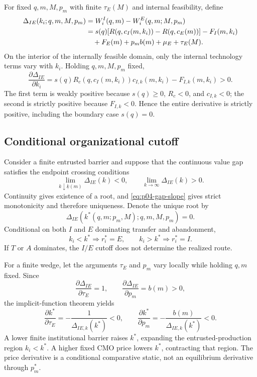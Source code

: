 For fixed \(q,m,M,p_m\) with finite \(\tau_E(M)\) and internal
feasibility, define
\begin{align}
  \Delta_{IE}(k_i;q,m,M,p_m)
  &=
  W_i^I(q,m)-W_i^E(q,m;M,p_m) \notag\\
  &=
  s(q)\!\left[
    R\!\left(q,c_I(m,k_i)\right)
    -R\!\left(q,c_E(m)\right)
  \right]
  -F_I(m,k_i) \notag\\
  &\quad
  +F_E(m)+p_m b(m)+\mu_E+\tau_E(M).
  \label{eq:p04-value-gap}
\end{align}
On the interior of the internally feasible domain, only the internal technology terms vary
with \(k_i\). Holding \(q,m,M,p_m\) fixed,
\begin{equation}
  \frac{\partial\Delta_{IE}}{\partial k_i}
  =
  s(q)R_c\!\left(q,c_I(m,k_i)\right)c_{I,k}(m,k_i)
  -
  F_{I,k}(m,k_i)
  >0.
  \label{eq:p04-gap-slope}
\end{equation}
The first term is weakly positive because \(s(q)\geq0\),
\(R_c<0\), and \(c_{I,k}<0\); the second is strictly positive because
\(F_{I,k}<0\). Hence the entire derivative is strictly positive, including
the boundary case \(s(q)=0\).

\subsection{Conditional organizational cutoff}
\label{subsec:p04-cutoff}

Consider a finite entrusted barrier and suppose that the continuous value gap
satisfies the endpoint crossing conditions
\[
  \lim_{k\downarrow\underline{k}(m)}\Delta_{IE}(k)<0,
  \qquad
  \lim_{k\to\infty}\Delta_{IE}(k)>0.
\]
Continuity gives existence of a root, and
\eqref{eq:p04-gap-slope} gives strict monotonicity and therefore uniqueness.
Denote the unique root by
\begin{equation}
  \Delta_{IE}\!\left(k^*(q,m;p_m,M);q,m,M,p_m\right)=0.
  \label{eq:p04-cutoff}
\end{equation}
Conditional on both \(I\) and \(E\) dominating transfer and abandonment,
\begin{equation}
  k_i<k^*\Rightarrow r_i^*=E,
  \qquad
  k_i>k^*\Rightarrow r_i^*=I.
  \label{eq:p04-cutoff-sorting}
\end{equation}
If \(T\) or \(A\) dominates, the \(I/E\) cutoff does not determine the
realized route.

For a finite wedge, let the arguments \(\tau_E\) and \(p_m\) vary locally
while holding \(q,m\) fixed. Since
\[
  \frac{\partial\Delta_{IE}}{\partial\tau_E}=1,
  \qquad
  \frac{\partial\Delta_{IE}}{\partial p_m}=b(m)>0,
\]
the implicit-function theorem yields
\begin{equation}
  \frac{\partial k^*}{\partial\tau_E}
  =
  -\frac{1}{\Delta_{IE,k}(k^*)}<0,
  \qquad
  \frac{\partial k^*}{\partial p_m}
  =
  -\frac{b(m)}{\Delta_{IE,k}(k^*)}<0.
  \label{eq:p04-cutoff-derivatives}
\end{equation}
A lower finite institutional barrier raises \(k^*\), expanding the
entrusted-production region \(k_i<k^*\). A higher fixed CMO price lowers
\(k^*\), contracting that region. The price derivative is a conditional
comparative static, not an equilibrium derivative through \(p_m^*\).


